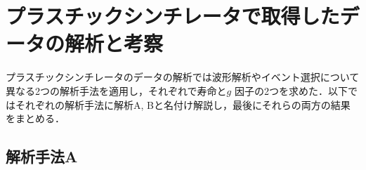 







%

\section{プラスチックシンチレータで取得したデータの解析と考察}

プラスチックシンチレータのデータの解析では波形解析やイベント選択について異なる2つの解析手法を適用し，それぞれで寿命と$g$ 因子の2つを求めた．以下ではそれぞれの解析手法に解析A, Bと名付け解説し，最後にそれらの両方の結果をまとめる．
 
\subsection{解析手法A}
